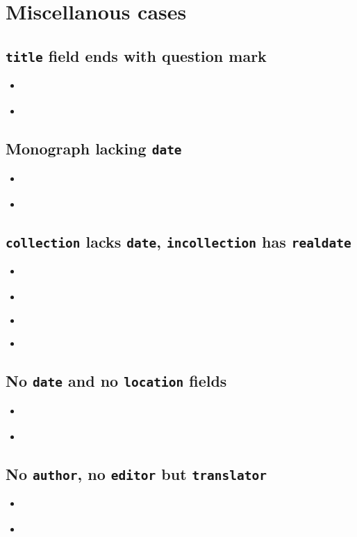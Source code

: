 \documentclass[a4paper,12pt]{scrartcl}
\newcommand{\Typ}[1]{\texttt{\symbol{64}#1}}
\newcommand{\Feld}[1]{\texttt{#1}}
\begin{document}
\section{Miscellanous cases}

\subsection{\Feld{title} field ends with question mark}
\begin{itemize}
    \item\cite{edenmo:1997}%
    \item{}
\end{itemize}

\subsection{Monograph lacking \Feld{date}}
\begin{itemize}
    \item\cite{siebert:u:et:al:o:j}%
    \item{}%
\end{itemize}

\subsection{\Typ{collection} lacks \Feld{date}, \Typ{incollection} has \Feld{realdate}}
\begin{itemize}
    \item\cite{huet:o:j}%
    \item{}%
    \item\cite{mette:1990}%
    \item{}%
\end{itemize}

\subsection{No \Feld{date} and no \Feld{location} fields}
\begin{itemize}
    \item\cite{fuchs:o:j}%
    \item{}%
\end{itemize}

\subsection{No \Feld{author}, no \Feld{editor} but \Feld{translator}}
\begin{itemize}
    \item\cite{sterk:1777}%
    \item{}%
\end{itemize}
\end{document}

